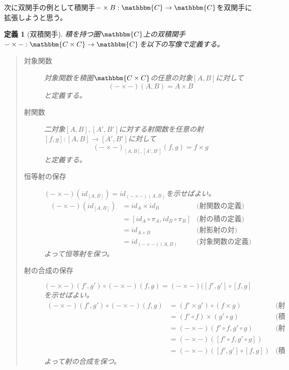 \documentclass[uplatex,dvipdfmx]{jsarticle}
\newcommand{\cat}[1]{\mathbbm{#1}}
\newcommand{\arrow}{\rightarrow}
\newcommand{\functor}[3]{#1:\cat{#2}\arrow \cat{#3}}
\newcommand{\mor}[3]{#1:#2\arrow #3}
\newcommand{\pcobj}[1]{[#1]}
\newtheorem{define}{定義}[section]
\numberwithin{proof}{subsection}
\numberwithin{prop}{subsection}
\numberwithin{define}{subsection}
\begin{document}
	次に双関手の例として積関手$\functor{-\times B}{C}{C}$を双関手に拡張しようと思う。
	\begin{define}[双積関手]
		積を持つ圏$\cat{C}$上の双積関手$\functor{-\times -}{C\times C}{C}$を以下の写像で定義する。
		\begin{quote}
			\begin{description}
				\item[対象関数] 対象関数を積圏$\cat{C\times C}$の任意の対象$\pcobj{A,B}$に対して\[(-\times -)(A,B)=A\times B\]と定義する。
				\item[射関数] 二対象$\pcobj{A,B},\pcobj{A',B'}$に対する射関数を任意の射$\mor{\pcobj{f,g}}{\pcobj{A,B}}{\pcobj{A',B'}}$に対して\[(-\times -)_{\pcobj{A,B},\pcobj{A',B'}}(f,g)=f\times g\]と定義する。
				\begin{center}
				\end{center}

				\item[恒等射の保存] $(-\times -)(id_{\pcobj{A,B}})=id_{(-\times-)(A,B)}$を示せばよい。
				\begin{align*}
					(-\times -)(id_{\pcobj{A,B}})&=id_A\times id_B&\text{(射関数の定義)}\\
					&=\pcobj{id_A\circ\pi_A,id_B\circ\pi_B}&\text{(射の積の定義)}\\
					&=id_{A\times B}&\text{(射影射の対)}\\
					&=id_{(-\times-)(A,B)}&\text{(対象関数の定義)}
				\end{align*}
				よって恒等射を保つ。
				\item[射の合成の保存] $(-\times -)(f',g')\circ(-\times-)(f,g)=(-\times-)(\pcobj{f',g'}\circ\pcobj{f,g}$を示せばよい。
				\begin{align*}
					(-\times -)(f',g')\circ(-\times-)(f,g)&=(f'\times g')\circ(f\times g)&\text{(射関数の定義)}\\
					&=(f'\circ f)\times(g'\circ g)&\text{(積と合成の交換)}\\
					&=(-\times-)(f'\circ f,g'\circ g)&\text{(射関数の定義)}\\
					&=(-\times-)(\pcobj{f'\circ f,g'\circ g})\\
					&=(-\times-)(\pcobj{f',g'}\circ\pcobj{f,g})&\text{(積圏の射の合成の定義)}
				\end{align*}
				よって射の合成を保つ。
			\end{description}
		\end{quote}
	\end{define}
\end{document}
